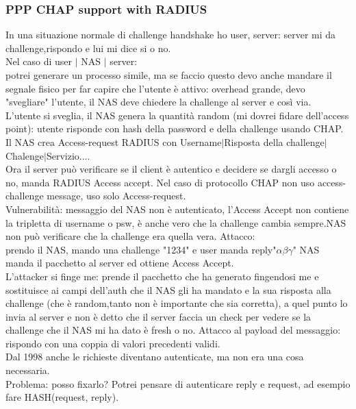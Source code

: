 \documentclass[16px]{article}
\begin{document}
\subsubsection{PPP CHAP support with RADIUS}
In una situazione normale di challenge handshake ho user, server: server mi da challenge,rispondo e lui mi dice si o no.\\ Nel caso di user $|$ NAS $|$ server:\\
potrei generare un processo simile, ma se faccio questo devo anche mandare il segnale fisico per far capire che l'utente è attivo: overhead grande, devo "svegliare" l'utente, il NAS deve chiedere la challenge al server e così via.\\ L'utente si sveglia, il NAS genera la quantità random (mi dovrei fidare dell'access point): utente risponde con hash della password e della challenge usando CHAP. Il NAS crea Access-request RADIUS con Username$|$Risposta della challenge$|$ Chalenge$|$Servizio....\\ Ora il server può verificare se il client è autentico e decidere se dargli accesso o no, manda RADIUS Access accept. Nel caso di protocollo CHAP non uso access-challenge message, uso solo Access-request.\\ Vulnerabilità: messaggio del NAS non è autenticato, l'Access Accept non contiene la tripletta di username o psw, è anche vero che la challenge cambia sempre.NAS non può verificare che la challenge era quella vera. Attacco:\\ prendo il NAS, mando una challenge "1234" e user manda reply"$\alpha\beta\gamma$" NAS manda il pacchetto al server ed ottiene Access Accept.\\L'attacker si finge me: prende il pacchetto che ha generato fingendosi me e sostituisce ai campi dell'auth che il NAS gli ha mandato e la sua risposta alla challenge (che è random,tanto non è importante che sia corretta), a quel punto lo invia al server e non è detto che il server faccia un check per vedere se la challenge che il NAS mi ha dato è fresh o no. Attacco al payload del messaggio: rispondo con una coppia di valori precedenti validi. \\ Dal 1998 anche le richieste diventano autenticate, ma non era una cosa necessaria.\\ Problema: posso fixarlo? Potrei pensare di autenticare reply e request, ad esempio fare HASH(request, reply).
\end{document}

